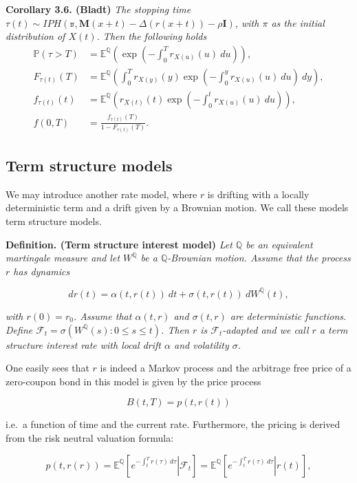 \documentclass[a4paper,10pt,openany]{book}
\begin{document}
\textbf{Corollary 3.6. (Bladt)} \emph{The stopping time \(\tau(t)\sim IPH(\mathbb \pi,\mathbf M(x+t)-\Delta (r(x+t))-\rho \mathbf I)\), with \(\pi\) as the initial distribution of \(X(t)\). Then the following holds}
\begin{align*}
\mathbb P(\tau > T)&=\mathbb E^{\mathbb Q}\left(\exp\left(-\int_0^T r_{X(u)}(u)\ du\right)\right),\\
F_{\tau(t)}(T)&=\mathbb E^{\mathbb Q}\left(\int_0^T r_{X(y)}(y)\exp\left(-\int_0^y r_{X(u)}(u)\ du\right)\ dy\right),\\
f_{\tau(t)}(t)&=\mathbb E^{\mathbb Q}\left( r_{X(t)}(t)\exp\left(-\int_0^t r_{X(u)}(u)\ du\right)\right),\\
f(0,T)&=\frac{f_{\tau(t)}(T)}{1-F_{\tau(t)}(T)}.
\end{align*}

\hypertarget{term-structure-models}{%
\subsection{Term structure models}\label{term-structure-models}}

We may introduce another rate model, where \(r\) is drifting with a locally deterministic term and a drift given by a Brownian motion. We call these models term structure models.

\textbf{Definition. (Term structure interest model)} \emph{Let \(\mathbb Q\) be an equivalent martingale measure and let \(W^{\mathbb Q}\) be a \(\mathbb Q\)-Brownian motion. Assume that the process \(r\) has dynamics}

\[
dr(t)=\alpha(t,r(t))\ dt + \sigma(t,r(t))\ dW^{\mathbb Q}(t),
\]

\emph{with \(r(0)=r_0\). Assume that \(\alpha(t,r)\) and \(\sigma(t,r)\) are deterministic functions. Define \(\mathcal F_t=\sigma(W^{\mathbb Q}(s) : 0\le s\le t)\). Then \(r\) is \(\mathcal F_t\)-adapted and we call \(r\) a term structure interest rate with local drift \(\alpha\) and volatility \(\sigma\).}

One easily sees that \(r\) is indeed a Markov process and the arbitrage free price of a zero-coupon bond in this model is given by the price process

\[
B(t,T)=p(t,r(t))
\]

i.e.~a function of time and the current rate. Furthermore, the pricing is derived from the risk neutral valuation formula:

\[
p(t,r(r))=\mathbb E^{\mathbb Q}\left[\left.e^{-\int_t^Tr(\tau)\ d\tau} \right\vert \mathcal{F}_t\right]=\mathbb E^{\mathbb Q}\left[\left.e^{-\int_t^Tr(\tau)\ d\tau} \right\vert r(t)\right],
\]
\end{document}
